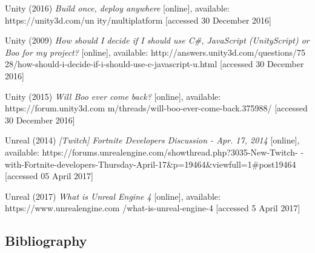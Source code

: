 \documentclass[12pt]{article}
\begin{document}
Unity (2016) \textit{Build once, deploy anywhere} [online], available: https://unity3d.com/un
\hangindent=0.5in ity/multiplatform [accessed 30 December 2016]

Unity (2009) \textit{How should I decide if I should use C#, JavaScript (UnityScript) or 
\hangindent=0.5in Boo for my project?} [online], available: http://answers.unity3d.com/questions/75
\hangindent=0.5in 28/how-should-i-decide-if-i-should-use-c-javascript-u.html [accessed 30 December 2016]

Unity (2015) \textit{Will Boo ever come back?} [online], available:
https://forum.unity3d.com
\hangindent=0.5in m/threads/will-boo-ever-come-back.375988/ [accessed 30
December 2016]

Unreal (2014) \textit{[Twitch] Fortnite Developers Discussion - Apr. 17, 2014} [online], \hangindent=0.5in available: https://forums.unrealengine.com/showthread.php?3035-New-Twitch-\hangindent=0.5in -with-Fortnite-developers-Thursday-April-17&p=19464&viewfull=1#post19464 [accessed 05 April 2017]

Unreal (2017) \textit{What is Unreal Engine 4} [online], available: https://www.unrealengine.com\hangindent=0.5in /what-is-unreal-engine-4 [accessed 5 April 2017]

\newpage
\begin{center}
\section{Bibliography}
\end{center}

\end{document}
